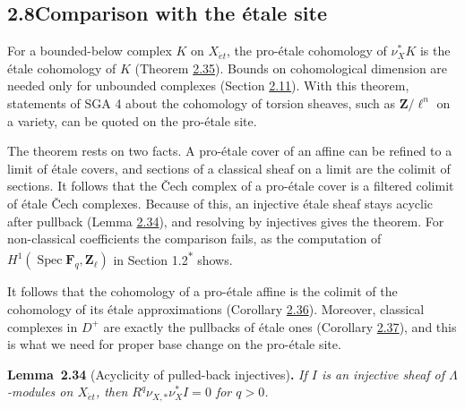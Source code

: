 \documentclass[11pt]{article}
\newenvironment{bpstatement}[2]{\par\addvspace{0.6\baselineskip}\noindent\textbf{#1}#2\textbf{.}\enspace\ignorespaces}
  {\par\addvspace{0.4\baselineskip}}
\newenvironment{bpstatementit}[2]{\begin{bpstatement}{#1}{#2}\itshape\ignorespaces}{\end{bpstatement}}
\newcommand{\bpout}[1]{#1\textsuperscript{\hyperlink{bp-outside}{\ensuremath{\ast}}}}
\begin{document}
\subsection*{\texorpdfstring{2.8\quad Comparison with the étale site}{2.8 Comparison with the étale site}}
\label{bp96}%
\label{bp97}%
For a bounded-below complex \(K\) on \(X_{\acute{e}t}\), the pro-étale cohomology of \(\nu_X^*K\) is the étale cohomology of \(K\) (Theorem \hyperref[bp101]{2.35}). Bounds on cohomological dimension are needed only for unbounded complexes (Section \hyperref[bp133]{2.11}). With this theorem, statements of SGA 4 about the cohomology of torsion sheaves, such as \(\mathbf Z/\ell^n\) on a variety, can be quoted on the pro-étale site.

The theorem rests on two facts. A pro-étale cover of an affine can be refined to a limit of étale covers, and sections of a classical sheaf on a limit are the colimit of sections. It follows that the Čech complex of a pro-étale cover is a filtered colimit of étale Čech complexes. Because of this, an injective étale sheaf stays acyclic after pullback (Lemma \hyperref[bp98]{2.34}), and resolving by injectives gives the theorem. For non-classical coefficients the comparison fails, as the computation of \(H^1(\operatorname{Spec}\mathbf F_q,\mathbf Z_\ell)\) in Section \bpout{1.2} shows.

It follows that the cohomology of a pro-étale affine is the colimit of the cohomology of its étale approximations (Corollary \hyperref[bp104]{2.36}). Moreover, classical complexes in \(D^+\) are exactly the pullbacks of étale ones (Corollary \hyperref[bp107]{2.37}), and this is what we need for proper base change on the pro-étale site.

\label{bp98}%
\begin{bpstatementit}{Lemma~2.34}{ (Acyclicity of pulled-back injectives)}
If \(I\) is an injective sheaf of \(\Lambda\)-modules on \(X_{\acute{e}t}\), then \(R^q\nu_{X,*}\nu_X^*I=0\) for \(q>0\).
\end{bpstatementit}
\end{document}
